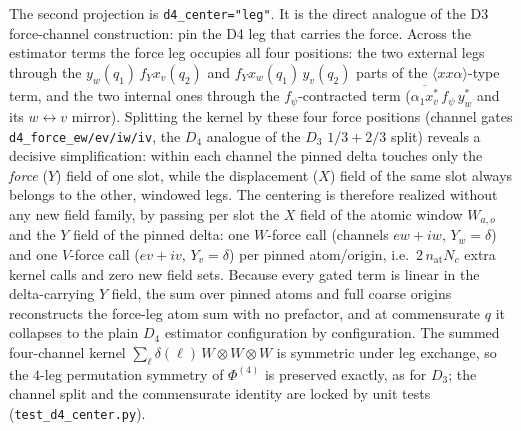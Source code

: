 \documentclass[11pt,a4paper]{article}
\begin{document}
The second projection is \texttt{d4\_center="leg"}.  It is the direct
analogue of the D3 force-channel construction: pin the D4 leg that carries
the force.  Across the estimator terms the force leg
occupies all four positions: the two external legs through the
$y_w(q_1)\,f_Y x_v(q_2)$ and $f_Y x_w(q_1)\,y_v(q_2)$ parts of the
$\langle xx\alpha\rangle$-type term, and the two internal ones through the
$f_\psi$-contracted term ($\overline{\alpha_1 x^*_v}\,f_\psi\,y^*_w$ and
its $w\!\leftrightarrow\!v$ mirror).  Splitting the kernel by these four
force positions (channel gates \texttt{d4\_force\_ew/ev/iw/iv}, the $D_4$
analogue of the $D_3$ $1/3{+}2/3$ split) reveals a decisive
simplification: within each channel the pinned delta touches only the
\emph{force} ($Y$) field of one slot, while the displacement ($X$) field
of the same slot always belongs to the other, windowed legs.  The
centering is therefore realized without any new field family, by passing
per slot the $X$ field of the atomic window $W_{a,o}$ and the $Y$ field of
the pinned delta: one $W$-force call (channels $ew{+}iw$, $Y_w=\delta$)
and one $V$-force call ($ev{+}iv$, $Y_v=\delta$) per pinned atom/origin,
i.e.\ $2\,n_{\mathrm{at}}N_c$ extra kernel calls and zero new field sets.
Because every gated term is linear in the delta-carrying $Y$ field, the
sum over pinned atoms and full coarse origins reconstructs the force-leg
atom sum with no prefactor, and at commensurate $q$ it collapses to the
plain $D_4$ estimator configuration by configuration.  The summed
four-channel kernel $\sum_{\ell}\delta(\ell)\,W\!\otimes\!W\!\otimes\!W$
is symmetric under leg exchange, so the $4$-leg permutation symmetry of
$\Phi^{(4)}$ is preserved exactly, as for $D_3$; the channel split and the
commensurate identity are locked by unit tests
(\texttt{test\_d4\_center.py}).
\end{document}
